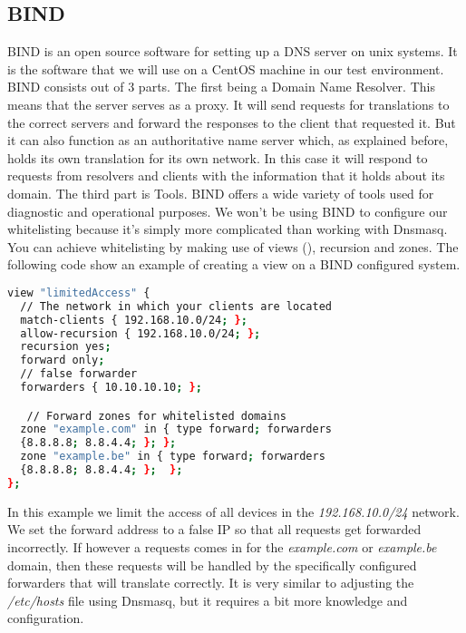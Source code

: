 \subsection{BIND}
BIND is an open source software for setting up a DNS server on unix systems. It is the software that we will use on a CentOS machine in our test environment. BIND consists out of 3 parts. The first being a Domain Name Resolver. This means that the server serves as a proxy. It will send requests for translations to the correct servers and forward the responses to the client that requested it. But it can also function as an authoritative name server which, as explained before, holds its own translation for its own network. In this case it will respond to requests from resolvers and clients with the information that it holds about its domain. The third part is Tools. BIND offers a wide variety of tools used for diagnostic and operational purposes. 
We won't be using BIND to configure our whitelisting because it's simply more complicated than working with Dnsmasq. You can achieve whitelisting by making use of views (\textcite{Views}), recursion and zones. The following code show an example of creating a view on a BIND configured system.
\begin{lstlisting}[language=sh]
view "limitedAccess" {
  // The network in which your clients are located
  match-clients { 192.168.10.0/24; };
  allow-recursion { 192.168.10.0/24; };
  recursion yes;
  forward only;
  // false forwarder
  forwarders { 10.10.10.10; };

   // Forward zones for whitelisted domains
  zone "example.com" in { type forward; forwarders 
  {8.8.8.8; 8.8.4.4; }; };
  zone "example.be" in { type forward; forwarders 
  {8.8.8.8; 8.8.4.4; };  };
};
\end{lstlisting}
In this example we limit the access of all devices in the \textit{192.168.10.0/24} network. We set the forward address to a false IP so that all requests get forwarded incorrectly. If however a requests comes in for the \textit{example.com} or \textit{example.be} domain, then these requests will be handled by the specifically configured forwarders that will translate correctly.
It is very similar to adjusting the \textit{/etc/hosts} file using Dnsmasq, but it requires a bit more knowledge and configuration.
